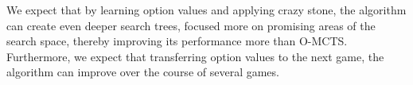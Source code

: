 We expect that by learning option values and applying crazy stone, the algorithm
can create even deeper search trees, focused more on promising areas of the
search space, thereby improving its performance more than O-MCTS. Furthermore,
we expect that transferring option values to the next game, the algorithm can
improve over the course of several games.
